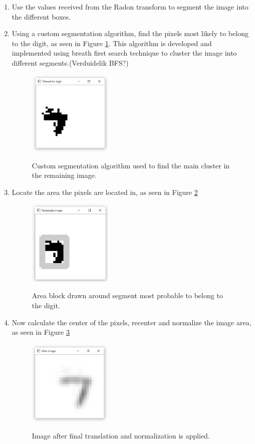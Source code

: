 \begin{enumerate}
\item Use the values received from the Radon transform to segment the image into the different boxes.
\item Using a custom segmentation algorithm, find the pixels most likely to belong to the digit, as seen in Figure \ref{fig:c}. This algorithm is developed and implemented using breath first search technique to cluster the image into different segments.(Verduidelik BFS?)

\begin{figure}
  \centering
  \includegraphics[width=4cm]{Cluster}\\
  \caption{Custom segmentation algorithm used to find the main cluster in the remaining image.}
  \label{fig:c}
\end{figure}

\item Locate the area the pixels are located in, as seen in Figure \ref{fig:areaLoc}

\begin{figure}
  \centering
  \includegraphics[width=4cm]{DetectArea}\\
  \caption{Area block drawn around segment most probable to belong to the digit.}
  \label{fig:areaLoc}
\end{figure}

\item Now calculate the center of the pixels, recenter and normalize the image area, as seen in Figure \ref{fig:final}

\begin{figure}
  \centering
  \includegraphics[width=4cm]{TranslateAndScale}\\
  \caption{Image after final translation and normalization is applied.}
  \label{fig:final}
\end{figure}


\end{enumerate}
